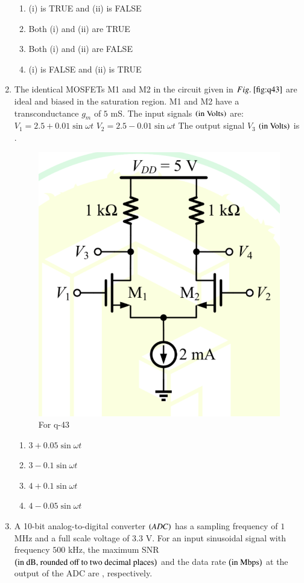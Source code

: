 \documentclass[journal,12pt,onecolumn]{IEEEtran}
\theoremstyle{remark}
\begin{document}
\begin{enumerate}
\hfill{}

\begin{enumerate}
\item (i) is TRUE and (ii) is FALSE
\item Both (i) and (ii) are TRUE
\item Both (i) and (ii) are FALSE
\item (i) is FALSE and (ii) is TRUE
\end{enumerate}

\item The identical MOSFETs M1 and M2 in the circuit given in $\figref{fig:q43}$ are ideal and biased in the saturation region. M1 and M2 have a transconductance $g_m$ of $5$ mS. The input signals $\left(\text{in Volts}\right)$ are:
$V_1 = 2.5 + 0.01 \sin \omega t$
$V_2 = 2.5 - 0.01 \sin \omega t$
The output signal $V_3$ $\left(\text{in Volts}\right)$ is \underline{\hspace{2cm}}.
\begin{figure}[H]
\centering
\includegraphics[width=0.5\columnwidth]{q43}
\caption{For q-43}
\label{fig:q43}
\end{figure}

\hfill{}
\begin{multicols}{2}
\begin{enumerate}
\item $3 + 0.05 \sin \omega t$
\item $3 - 0.1 \sin \omega t$
\item $4 + 0.1 \sin \omega t$
\item $4 - 0.05 \sin \omega t$
\end{enumerate}    
\end{multicols}


\item A 10-bit analog-to-digital converter $\left(ADC\right)$ has a sampling frequency of $1$ MHz and a full scale voltage of $3.3$ V. For an input sinusoidal signal with frequency $500$ kHz, the maximum SNR $\left(\text{in dB, rounded off to two decimal places}\right)$ and the data rate $\left(\text{in Mbps}\right)$ at the output of the ADC are \underline{\hspace{2cm}}, respectively.


\end{enumerate}
\end{document}

